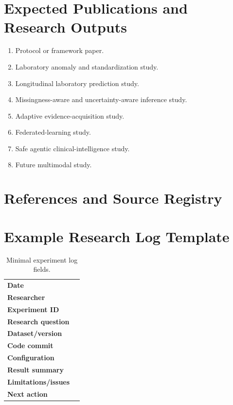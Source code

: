 \documentclass[11pt,journal,onecolumn,draftclsnofoot]{IEEEtran}
\begin{document}
\section{Expected Publications and Research Outputs}
\begin{enumerate}
    \item Protocol or framework paper.
    \item Laboratory anomaly and standardization study.
    \item Longitudinal laboratory prediction study.
    \item Missingness-aware and uncertainty-aware inference study.
    \item Adaptive evidence-acquisition study.
    \item Federated-learning study.
    \item Safe agentic clinical-intelligence study.
    \item Future multimodal study.
\end{enumerate}

\section{References and Source Registry}



\appendices
\section{Example Research Log Template}
\begin{table}[H]
\centering
\caption{Minimal experiment log fields.}
\label{tab:research-log}
\begin{tabularx}{\textwidth}{@{}>{\bfseries}p{}X@{}}
Date & \\
Researcher & \\
Experiment ID & \\
Research question & \\
Dataset/version & \\
Code commit & \\
Configuration & \\
Result summary & \\
Limitations/issues & \\
Next action & \\
\end{tabularx}
\end{table}
\end{document}
